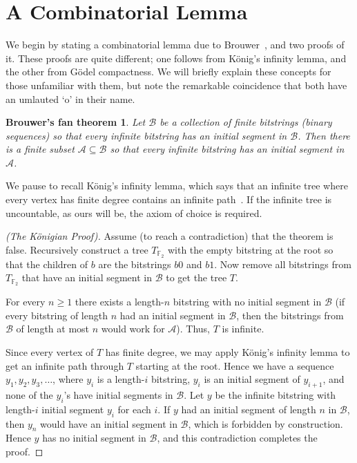 \documentclass[12pt]{amsart}
\def\F{\mathbb{F}}
\theoremstyle{plain}
\newtheorem*{CombinatorialLemma}{Brouwer's fan theorem}
\theoremstyle{definition}
\theoremstyle{remark}
\begin{document}

\section{A Combinatorial Lemma}

We begin by stating a combinatorial lemma due to
Brouwer~\cite{Brouwer:27}, and two proofs of it. These proofs are
quite different; one follows from K\"onig's infinity lemma, and the
other from G\"odel compactness. We will briefly explain these concepts
for those unfamiliar with them, but note the remarkable coincidence that 
both have an umlauted `o' in their name.
\begin{CombinatorialLemma}
  \label{lemma:bitstrings}
  Let $\mathcal{B}$ be a collection of finite bitstrings (binary
  sequences) so that every infinite bitstring has an initial segment
  in $\mathcal{B}$. Then there is a finite subset
  $\mathcal{A}\subseteq\mathcal{B}$ so that every infinite bitstring
  has an initial segment in $\mathcal{A}$.
\end{CombinatorialLemma}
We pause to recall K\"onig's infinity lemma, which says that an
infinite tree where every vertex has finite degree contains an
infinite path~\cite{Konig:36}. If the infinite tree is uncountable, as
ours will be, the axiom of choice is required.
\begin{proof}[(The K\"onigian Proof)]
  Assume (to reach a contradiction) that the theorem is false.
  Recursively construct a tree $T_{\F_2}$ with the empty bitstring at
  the root so that the children of $b$ are the bitstrings $b0$ and
  $b1$. Now remove all bitstrings from $T_{\F_2}$ that have an initial
  segment in $\mathcal{B}$ to get the tree $T$.
 
  For every $n\geq 1$ there exists a length-$n$ bitstring with no
  initial segment in $\mathcal{B}$ (if every bitstring of length $n$
  had an initial segment in $\mathcal{B}$, then the bitstrings from
  $\mathcal{B}$ of length at most $n$ would work for $\mathcal{A}$).
  Thus, $T$ is infinite.

  Since every vertex of $T$ has finite degree, we may apply K\"onig's
  infinity lemma to get an infinite path through $T$ starting at the
  root.  Hence we have a sequence $y_1,y_2,y_3,\dots$, where $y_i$ is
  a length-$i$ bitstring, $y_i$ is an initial segment of $y_{i+1}$,
  and none of the $y_i$'s have initial segments in $\mathcal{B}$.  Let
  $y$ be the infinite bitstring with length-$i$ initial segment $y_i$
  for each $i$. If $y$ had an initial segment of length $n$ in
  $\mathcal{B}$, then $y_n$ would have an initial segment in
  $\mathcal{B}$, which is forbidden by construction.  Hence $y$ has no
  initial segment in $\mathcal{B}$, and this contradiction completes
  the proof.
\end{proof}
\end{document}
